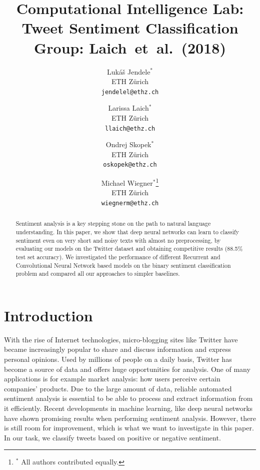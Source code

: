 \documentclass[10pt,conference,compsocconf]{IEEEtran}
\begin{document}
\title{Computational Intelligence Lab: Tweet Sentiment Classification\\ {\large Group: Laich~et~al.~(2018)}}

\author{
  Luk\'{a}\v{s} Jendele$^\ast$\\
  ETH Z\"{u}rich\\
  \texttt{jendelel@ethz.ch}\\
  \and
  Larissa Laich$^\ast$\\
  ETH Z\"{u}rich\\
  \texttt{llaich@ethz.ch}\\
  \and
  Ondrej Skopek$^\ast$\\
  ETH Z\"{u}rich\\
  \texttt{oskopek@ethz.ch}\\
  \and
  Michael Wiegner$^\ast$\thanks{$^\ast$ All authors contributed equally.}\\
  ETH Z\"{u}rich\\
  \texttt{wiegnerm@ethz.ch}\\
}

\maketitle%

\begin{abstract}
Sentiment analysis is a key stepping stone on the path to natural language understanding. In this paper, we show that deep neural networks can learn to classify sentiment even on very short and noisy texts with almost no preprocessing, by evaluating our models on the Twitter dataset and obtaining competitive results (88.5\% test set accuracy). We investigated the performance of different Recurrent and Convolutional Neural Network based models on the binary sentiment classification problem and compared all our approaches to simpler baselines.
\end{abstract}

\section{Introduction}
With the rise of Internet technologies, micro-blogging sites like Twitter have became increasingly popular to share and discuss information and express personal opinions. Used by millions of people on a daily basis, Twitter has become a source of data and offers huge opportunities for analysis. One of many applications is for example market analysis: how users perceive certain companies' products. Due to the large amount of data, reliable automated sentiment analysis is essential to be able to process and extract information from it efficiently. Recent developments in machine learning, like deep neural networks have shown promising results when performing sentiment analysis. However, there is still room for improvement, which is what we want to investigate in this paper. In our task, we classify tweets based on positive or negative sentiment.
\end{document}
